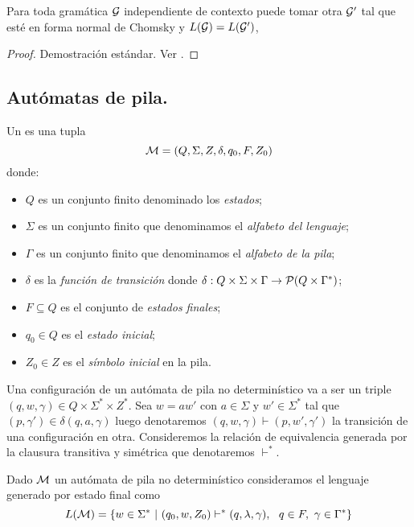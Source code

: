 \documentclass[tesis.tex]{subfiles}
\begin{document}
\begin{prop}
	Para toda gramática $\cal G$ independiente de contexto puede tomar otra $\cal G'$ tal que esté en forma normal de Chomsky y $L({\cal G}) = L(\cal G')$,
\end{prop}

\begin{proof}
	Demostración estándar. Ver \cite{hopcraft-ullman}.
\end{proof}

\subsection{Autómatas de pila.}

\begin{deff}
	Un  es una tupla 
	\[
	{\cal M } = (Q, \Sigma, Z, \delta, q_0, F, Z_0)
	\]
	 donde:
	\begin{itemize}
		\item $Q$ es un conjunto finito denominado los \emph{estados};
		\item $\Sigma$ es un conjunto finito que denominamos el \emph{alfabeto del lenguaje};
		\item $\Gamma$ es un conjunto finito que denominamos el \emph{alfabeto de la pila};
		\item $\delta$ es la \emph{función de transición} donde $\delta: Q  \times \Sigma \times \Gamma \to {\cal P}( Q  \times \Gamma^*)$;
		\item $F \subseteq Q$ es el conjunto de \emph{estados finales};
		\item $q_0 \in Q$ es el \emph{estado inicial};
		\item $Z_0 \in Z$ es el \emph{símbolo inicial} en la pila.
	\end{itemize}
\end{deff}

Una configuración de un autómata de pila no determinístico va a ser un triple $(q,w,\gamma) \in Q \times \Sigma^* \times Z^*$.
Sea $w = aw'$ con $a \in \Sigma$ y $w' \in \Sigma^*$ tal que $(p,\gamma') \in \delta (q,a,\gamma)$ luego denotaremos $(q,w,\gamma) \vdash (p,w',\gamma')$ la transición de una configuración en otra.
Consideremos la relación de equivalencia generada por la clausura transitiva y simétrica que denotaremos $\vdash^*$.


\begin{deff}
	Dado $\cal M$ un autómata de pila no determinístico consideramos el lenguaje generado por estado final como
	\begin{equation*}
		L( {\cal M}) = \{ w \in \Sigma^* \ | \ (q_0,w,Z_0) \vdash^* (q, \lambda, \gamma), \ \ q \in F, \ \gamma \in \Gamma^*      \}
	\end{equation*}
\end{deff}
\end{document}
